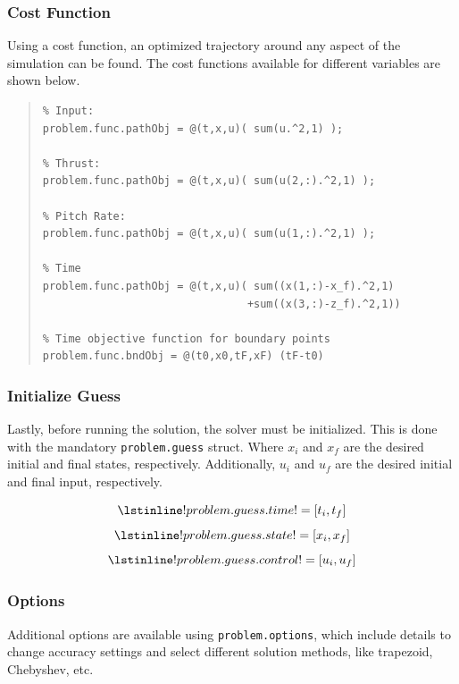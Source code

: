 \documentclass[12pt]{article}
\begin{document}
\subsubsection{Cost Function}
Using a cost function, an optimized trajectory around any aspect of the simulation can be found. The cost functions available for different variables are shown below. 
\begin{quote}
\begin{lstlisting}
% Input:
problem.func.pathObj = @(t,x,u)( sum(u.^2,1) );

% Thrust:
problem.func.pathObj = @(t,x,u)( sum(u(2,:).^2,1) );

% Pitch Rate:
problem.func.pathObj = @(t,x,u)( sum(u(1,:).^2,1) );

% Time
problem.func.pathObj = @(t,x,u)( sum((x(1,:)-x_f).^2,1) 
                                +sum((x(3,:)-z_f).^2,1))

% Time objective function for boundary points
problem.func.bndObj = @(t0,x0,tF,xF) (tF-t0)

\end{lstlisting}
\end{quote}

\subsubsection{Initialize Guess}
Lastly, before running the solution, the solver must be initialized. This is done with the mandatory \lstinline!problem.guess! struct. Where $x_{i}$ and $x_{f}$ are the desired initial and final states, respectively. Additionally, $u_{i}$ and $u_{f}$ are the desired initial and final input, respectively. 

\begin{figure}[H]
\begin{equation*}
\lstinline!problem.guess.time! = [t_{i}, t_{f}]
\end{equation*}
\begin{equation*}
\lstinline!problem.guess.state! = [x_{i}, x_{f}]
\end{equation*}
\begin{equation*}
\lstinline!problem.guess.control! = [u_{i}, u_{f}] 
\end{equation*}
\end{figure}
\subsubsection{Options}
Additional options are available using \lstinline!problem.options!, which include details to change accuracy settings and select different solution methods, like trapezoid, Chebyshev, etc.
\end{document}
